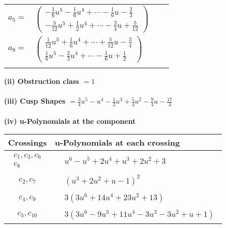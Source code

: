\documentclass[1p]{elsarticle_modified}
\theoremstyle{definition}
\begin{document}
\begin{tabular}{m{7pt} m{180pt} m{7pt} m{180pt} }
\flushright $a_{5}=$&$\begin{pmatrix}-\frac{1}{6} u^5-\frac{1}{6} u^4+\cdots-\frac{1}{6} u-\frac{2}{3}\\-\frac{5}{12} u^5+\frac{1}{2} u^4+\cdots-\frac{3}{4} u+\frac{5}{12}\end{pmatrix}$ \\
\flushright $a_{9}=$&$\begin{pmatrix}\frac{1}{12} u^5+\frac{1}{6} u^4+\cdots+\frac{5}{12} u-\frac{3}{4}\\\frac{1}{6} u^5-\frac{2}{3} u^4+\cdots-\frac{1}{6} u+\frac{1}{2}\end{pmatrix}$\\&\end{tabular}
\flushleft \textbf{(ii) Obstruction class $= 1$}\\~\\
\flushleft \textbf{(iii) Cusp Shapes $= \frac{3}{4} u^5- u^4-\frac{1}{2} u^3+\frac{5}{4} u^2-\frac{9}{4} u-\frac{17}{4}$}\\~\\
\newpage\renewcommand{\arraystretch}{1}
\flushleft \textbf{(iv) u-Polynomials at the component}\newline \\
\begin{tabular}{m{50pt}|m{274pt}}
Crossings & \hspace{64pt}u-Polynomials at each crossing \\
\hline $$\begin{aligned}c_{1},c_{3},c_{6}\\c_{8}\end{aligned}$$&$\begin{aligned}
&u^6- u^5+2 u^4+u^3+2 u^2+3
\end{aligned}$\\
\hline $$\begin{aligned}c_{2},c_{7}\end{aligned}$$&$\begin{aligned}
&(u^3+2 u^2+u-1)^2
\end{aligned}$\\
\hline $$\begin{aligned}c_{4},c_{9}\end{aligned}$$&$\begin{aligned}
&3(3 u^6+14 u^4+23 u^2+13)
\end{aligned}$\\
\hline $$\begin{aligned}c_{5},c_{10}\end{aligned}$$&$\begin{aligned}
&3(3 u^6-9 u^5+11 u^4-3 u^3-3 u^2+u+1)
\end{aligned}$\\
\hline
\end{tabular}\\~\\
\end{document}
